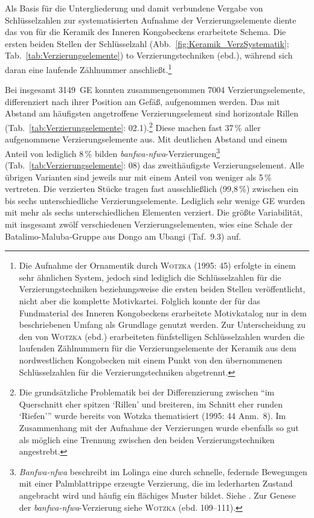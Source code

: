 \begin{multicols}{2}
Als Basis für die Untergliederung und damit verbundene Vergabe von Schlüsselzahlen zur systematisierten Aufnahme der Verzierungselemente diente das von \textcite[44 Tab.~3]{Wotzka.1995} für die Keramik des Inneren Kongobeckens erarbeitete Schema. Die ersten beiden Stellen der Schlüsselzahl (Abb.~\ref{fig:Keramik_VerzSystematik}; Tab.~\ref{tab:Verzierungselemente}) \hbox to \columnwidth{beziehen sich auf die von Wotzka differenzierten} Verzierungstechniken (ebd.), während sich daran eine laufende Zählnummer anschließt.\footnote{Die Aufnahme der Ornamentik durch \textsc{Wotzka} (1995: 45) erfolgte in einem sehr ähnlichen System, jedoch sind lediglich die Schlüsselzahlen für die Verzierungstechniken beziehungsweise die ersten beiden Stellen veröffentlicht, nicht aber die komplette Motivkartei. Folglich konnte der für das Fundmaterial des Inneren Kongobeckens erarbeitete Motivkatalog nur in dem beschriebenen Umfang als Grundlage genutzt werden. Zur Unterscheidung zu den von \textsc{Wotzka} (ebd.) erarbeiteten fünfstelligen Schlüsselzahlen wurden die laufenden Zählnummern für die Verzierungselemente der Keramik aus dem nordwestlichen Kongobecken mit einem Punkt von den übernommenen Schlüsselzahlen für die Verzierungstechniken abgetrennt.}

Bei insgesamt 3149~GE konnten zusammengenommen 7004 Verzierungselemente, differenziert nach ihrer Position am Gefäß, aufgenommen werden. Das mit Abstand am häufigsten angetroffene Verzierungselement sind horizontale Rillen (Tab.~\ref{tab:Verzierungselemente}: 02.1).\footnote{Die grundsätzliche Problematik bei der Differenzierung zwischen \enquote{im Querschnitt eher spitzen \enquote{Rillen} und breiteren, im Schnitt eher runden \enquote{Riefen}} wurde bereits von Wotzka thematisiert (1995: 44 Anm.~8). Im Zusammenhang mit der Aufnahme der Verzierungen wurde ebenfalls so gut als möglich eine Trennung zwischen den beiden Verzierungstechniken angestrebt.} Diese machen fast 37\,\% aller aufgenommene Verzierungselemente aus. Mit deutlichen Abstand und einem Anteil von lediglich 8\,\% bilden \textit{banfwa-nfwa}-Verzierungen\footnote{\textit{Banfwa-nfwa} beschreibt im Lolinga eine durch schnelle, federnde Bewegungen mit einer Palmblattrippe erzeugte Verzierung, die im lederharten Zustand angebracht wird und häufig ein flächiges Muster bildet. Siehe \textcites[386 Anm.~5]{Eggert.1980b}[399 Anm.~19]{Eggert.1980c}[38 Anm.~2, 109--112]{Wotzka.1995}. Zur Genese der \textit{banfwa-nfwa}-Verzierung siehe \textsc{Wotzka} (ebd. 109--111).\label{ftn:banfwa-nfwa}} (Tab.~\ref{tab:Verzierungselemente}: 08) das zweithäufigste Verzierungselement. Alle übrigen Varianten sind jeweils nur mit einem Anteil von weniger als 5\,\% vertreten. Die verzierten Stücke tragen fast ausschließlich (99,8\,\%) zwischen ein bis sechs unterschiedliche Verzierungselemente. Lediglich sehr wenige GE wurden mit mehr als sechs unterschiedlichen Elementen verziert. Die größte Variabilität, mit insgesamt zwölf verschiedenen Verzierungselementen, wies eine Schale der Batalimo-Maluba-Gruppe aus Dongo am \mbox{Ubangi} (Taf.~9.3) auf.


\end{multicols}
